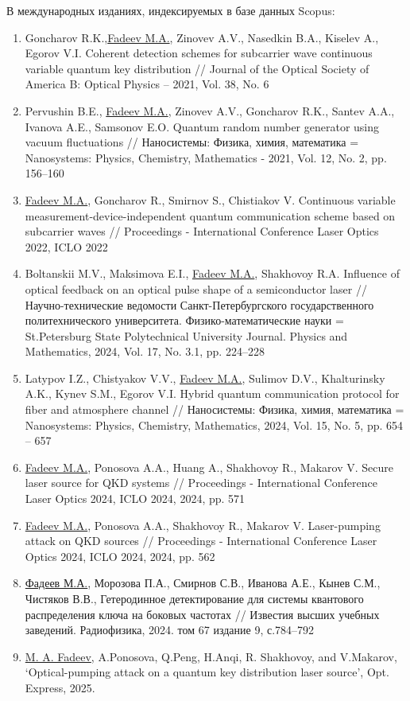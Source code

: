 В международных изданиях, индексируемых в базе данных Scopus:\\
\begin{enumerate}
    \item Goncharov R.K.,\underline{Fadeev M.A.}, Zinovev A.V., Nasedkin B.A., Kiselev A., Egorov V.I. Coherent detection schemes for subcarrier wave continuous variable quantum key distribution // Journal of the Optical Society of America B: Optical Physics -- 2021, Vol. 38, No. 6
    \item Pervushin B.E., \underline{Fadeev M.A.}, Zinovev A.V., Goncharov R.K., Santev A.A., Ivanova A.E., Samsonov E.O. Quantum random number generator using vacuum fluctuations // Наносистемы: Физика, химия, математика = Nanosystems: Physics, Chemistry, Mathematics - 2021, Vol. 12, No. 2, pp. 156--160
    \item \underline{Fadeev M.A.}, Goncharov R., Smirnov S., Chistiakov V. Continuous variable measurement-device-independent quantum communication scheme based on subcarrier waves // Proceedings - International Conference Laser Optics 2022, ICLO 2022
    \item Boltanskii M.V., Maksimova E.I., \underline{Fadeev M.A.}, Shakhovoy R.A. Influence of optical feedback on an optical pulse shape of a semiconductor laser // Научно-технические ведомости Санкт-Петербургского государственного политехнического университета. Физико-математические науки = St.Petersburg State Polytechnical University Journal. Physics and Mathematics, 2024, Vol. 17, No. 3.1, pp. 224--228
    \item Latypov I.Z., Chistyakov V.V., \underline{Fadeev M.A.}, Sulimov D.V., Khalturinsky A.K., Kynev S.M., Egorov V.I. Hybrid quantum communication protocol for fiber and atmosphere channel // Наносистемы: Физика, химия, математика = Nanosystems: Physics, Chemistry, Mathematics, 2024, Vol. 15, No. 5, pp. 654 -- 657
    \item \underline{Fadeev M.A.}, Ponosova A.A., Huang A., Shakhovoy R., Makarov V. Secure laser source for QKD systems // Proceedings - International Conference Laser Optics 2024, ICLO 2024, 2024, pp. 571
    \item \underline{Fadeev M.A.}, Ponosova A.A., Shakhovoy R., Makarov V. Laser-pumping attack on QKD sources // Proceedings - International Conference Laser Optics 2024, ICLO 2024, 2024, pp. 562
    \item \underline{Фадеев М.А.}, Морозова П.А., Смирнов С.В., Иванова А.Е., Кынев С.М., Чистяков В.В., Гетеродинное детектирование для системы квантового распределения ключа на боковых частотах // Известия высших учебных заведений. Радиофизика, 2024. том 67 издание 9, с.784--792
    \item \underline{M. A. Fadeev}, A.Ponosova, Q.Peng, H.Anqi, R. Shakhovoy, and V.Makarov, `Optical-pumping attack on a quantum key distribution laser source', Opt. Express, 2025.

\end{enumerate}


